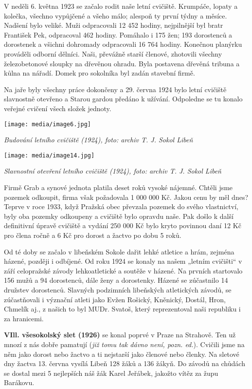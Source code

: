 V neděli 6. května 1923 se začalo rodit naše letní cvičiště. Krumpáče,
lopaty a kolečka, všechno vypůjčené a všeho málo; alespoň ty první týdny
a měsíce. Nadšení bylo veliké. Muži odpracovali 12 452 hodiny,
nejpilnější byl bratr František Pek, odpracoval 462 hodiny. Pomáhalo i
175 žen; 193 dorostenců a dorostenek a všichni dohromady odpracovali 16
764 hodiny. Konečnou planýrku prováděli odborní dělníci. Naši, převážně
starší členové, zhotovili všechny železobetonové sloupky na dřevěnou
ohradu. Byla postavena dřevěná tribuna a kůlna na nářadí. Domek pro
sokolníka byl zadán stavební firmě.

Na jaře byly všechny práce dokončeny a 29. června 1924 bylo letní
cvičiště slavnostně otevřeno a Starou gardou předáno k užívání.
Odpoledne se tu konalo veřejné cvičení všech složek jednoty.

\texttt{[image: media/image6.jpg]}

\emph{Budování letního cvičiště (1924), foto: archiv T. J. Sokol Libeň}

\texttt{[image: media/image14.jpg]}

\emph{Slavnostní otevření letního cvičiště (1924), foto: archiv T. J.
Sokol Libeň}

Firmě Grab a synové jednota platila deset roků vysoké nájemné. Chtěli
jsme pozemek odkoupit, firma však požadovala 1 000 000 Kč. Jakou cenu by
měl dnes? Teprve v roce 1933, když Pražská obec převzala pozemek do
svého vlastnictví, byly oba pozemky odkoupeny a cvičiště bylo opravdu
naše. Pak došlo k další definitivní úpravě cvičiště a vydání 250 000 Kč
bylo kryto povinnou daní 12 Kč pro člena ročně a 6 Kč pro dorost a
žactvo po dobu 5 roků.

Od té doby se začalo v libeňském Sokole dařit lehké atletice a hrám,
zejména házené, později i odbíjené. Od roku 1924 se konaly na našem
„letním cvičišti`` v září celopražské závody lehkoatletické a soutěže v
házené. Na prvních startovalo 156 mužů a 94 dorostenců, dále ženy a
dorostenky. Házené se zúčastnilo 14 družstev dorostenců. Slavných
podzimních libeňských atletických závodů, se zúčastňovali i význační
atleti jako Evžen Rošický, Kněnický, Dostál, Hron, Chmelík aj., z našich
to byl MUDr. Svatoš, který reprezentoval naši republiku i za hranicemi.

\textbf{VIll. všesokolský slet (1926)} se konal poprvé v Praze na
Strahově. Ten už mnozí z nás dobře pamatují (\emph{již tomu tak dávno
není, pozn. ed.}). Cvičili jsme na něm jako dorost nebo žactvo a ti
nejstarší jako členové nebo členky. Na sletové dny žactva 13. června
vysílá Libeň 128 žáků a 136 žákyň. Do závodů na chůdách se dostal mezi 5
nejlepších náš žák Karel Jeřábek, jakožto vítěz za župu Barákovu.

